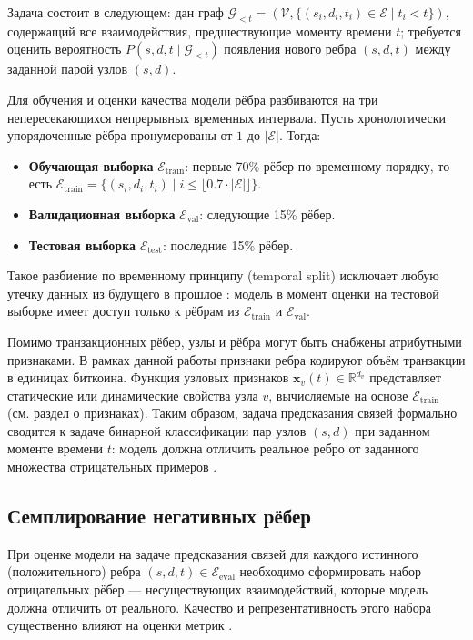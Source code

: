 \documentclass[a4paper,12pt]{extarticle}
\begin{document}
Задача состоит в следующем: дан граф $\mathcal{G}_{<t} = (\mathcal{V}, \{(s_i, d_i, t_i) \in \mathcal{E} \mid t_i < t\})$, содержащий все взаимодействия, предшествующие моменту времени $t$; требуется оценить вероятность $P(s, d, t \mid \mathcal{G}_{<t})$ появления нового ребра $(s, d, t)$ между заданной парой узлов $(s, d)$.

Для обучения и оценки качества модели рёбра разбиваются на три непересекающихся непрерывных временных интервала. Пусть хронологически упорядоченные рёбра пронумерованы от $1$ до $|\mathcal{E}|$. Тогда:
\begin{itemize}
    \item \textbf{Обучающая выборка} $\mathcal{E}_{\text{train}}$: первые 70\% рёбер по временному порядку, то есть $\mathcal{E}_{\text{train}} = \{(s_i, d_i, t_i) \mid i \leq \lfloor 0.7 \cdot |\mathcal{E}| \rfloor\}$.
    \item \textbf{Валидационная выборка} $\mathcal{E}_{\text{val}}$: следующие 15\% рёбер.
    \item \textbf{Тестовая выборка} $\mathcal{E}_{\text{test}}$: последние 15\% рёбер.
\end{itemize}
Такое разбиение по временному принципу (temporal split) исключает любую утечку данных из будущего в прошлое \cite{poursafaei2022towards}: модель в момент оценки на тестовой выборке имеет доступ только к рёбрам из $\mathcal{E}_{\text{train}}$ и $\mathcal{E}_{\text{val}}$.

Помимо транзакционных рёбер, узлы и рёбра могут быть снабжены атрибутными признаками. В рамках данной работы признаки ребра кодируют объём транзакции в единицах биткоина. Функция узловых признаков $\mathbf{x}_v(t) \in \mathbb{R}^{d_v}$ представляет статические или динамические свойства узла $v$, вычисляемые на основе $\mathcal{E}_{\text{train}}$ (см. раздел о признаках). Таким образом, задача предсказания связей формально сводится к задаче бинарной классификации пар узлов $(s, d)$ при заданном моменте времени $t$: модель должна отличить реальное ребро от заданного множества отрицательных примеров \cite{xu2020inductive}.

\subsection{Семплирование негативных рёбер}

При оценке модели на задаче предсказания связей для каждого истинного (положительного) ребра $(s, d, t) \in \mathcal{E}_{\text{eval}}$ необходимо сформировать набор отрицательных рёбер — несуществующих взаимодействий, которые модель должна отличить от реального. Качество и репрезентативность этого набора существенно влияют на оценки метрик \cite{poursafaei2022towards}.
\end{document}
